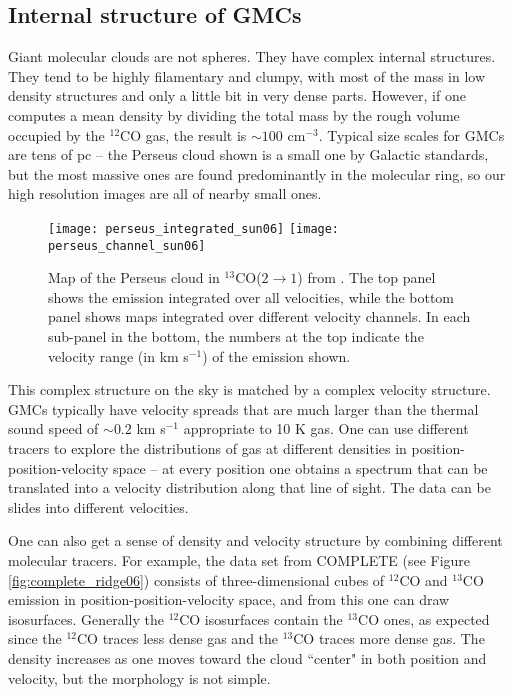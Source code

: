 \subsection{Internal structure of GMCs}

Giant molecular clouds are not spheres. They have complex internal structures. They tend to be highly filamentary and clumpy, with most of the mass in low density structures and only a little bit in very dense parts. However, if one computes a mean density by dividing the total mass by the rough volume occupied by the $^{12}$CO gas, the result is $\sim 100$ cm$^{-3}$. Typical size scales for GMCs are tens of pc -- the Perseus cloud shown is a small one by Galactic standards, but the most massive ones are found predominantly in the molecular ring, so our high resolution images are all of nearby small ones.

\begin{figure}
\texttt{[image: perseus\_integrated\_sun06]}
\texttt{[image: perseus\_channel\_sun06]}
\caption[$^{13}$CO($2\rightarrow 1$) maps of Perseus]{
\label{fig:perseus_sun06}
Map of the Perseus cloud in $^{13}$CO($2\rightarrow 1$) from \citet{sun06a}. The top panel shows the emission integrated over all velocities, while the bottom panel shows maps integrated over different velocity channels. In each sub-panel in the bottom, the numbers at the top indicate the velocity range (in km s$^{-1}$) of the emission shown.
}
\end{figure}

This complex structure on the sky is matched by a complex velocity structure. GMCs typically have velocity spreads that are much larger than the thermal sound speed of $\sim 0.2$ km s$^{-1}$ appropriate to 10 K gas. One can use different tracers to explore the distributions of gas at different densities in position-position-velocity space -- at every position one obtains a spectrum that can be translated into a velocity distribution along that line of sight. The data can be slides into different velocities.

One can also get a sense of density and velocity structure by combining different molecular tracers. For example, the data set from COMPLETE (see Figure \ref{fig:complete_ridge06}) consists of three-dimensional cubes of $^{12}$CO and $^{13}$CO emission in position-position-velocity space, and from this one can draw isosurfaces. Generally the $^{12}$CO isosurfaces contain the $^{13}$CO ones, as expected since the $^{12}$CO traces less dense gas and the $^{13}$CO traces more dense gas. The density increases as one moves toward the cloud ``center" in both position and velocity, but the morphology is not simple.   

